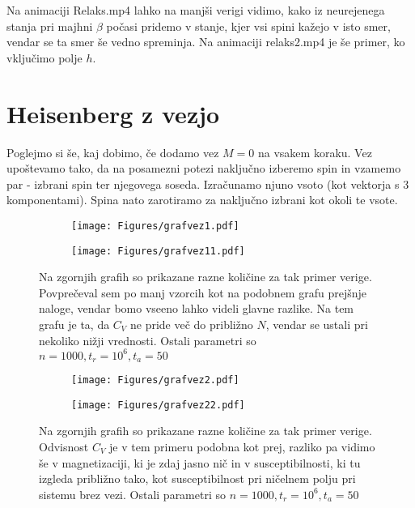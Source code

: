 \documentclass{article}
\begin{document}
Na animaciji Relaks.mp4 lahko na manjši verigi vidimo, kako iz neurejenega stanja pri majhni $\beta$ počasi pridemo v stanje, kjer vsi spini kažejo v isto smer, vendar se ta smer še vedno spreminja. Na animaciji relaks2.mp4 je še primer, ko vključimo polje $h$.

\section*{Heisenberg z vezjo}
Poglejmo si še, kaj dobimo, če dodamo vez $M=0$ na vsakem koraku. Vez upoštevamo tako, da na posamezni potezi naključno izberemo  spin in vzamemo par - izbrani spin ter njegovega soseda. Izračunamo njuno vsoto (kot vektorja s 3 komponentami). Spina nato zarotiramo za naključno izbrani kot okoli te vsote.

\begin{figure}[H]
\centering
\begin{subfigure}{.49\textwidth}
\texttt{[image: Figures/grafvez1.pdf]}
\end{subfigure}
\begin{subfigure}{.49\textwidth}
\texttt{[image: Figures/grafvez11.pdf]}
\end{subfigure}
\caption*{Na zgornjih grafih so prikazane razne količine za tak primer verige. Povprečeval sem po manj vzorcih kot na podobnem grafu prejšnje naloge, vendar bomo vseeno lahko videli glavne razlike. Na tem grafu je ta, da $C_V$ ne pride več do približno $N$, vendar se ustali pri nekoliko nižji vrednosti.  Ostali parametri so $n=1000, t_r=10^6, t_a=50$}
\end{figure}

\begin{figure}[H]
\centering
\begin{subfigure}{.49\textwidth}
\texttt{[image: Figures/grafvez2.pdf]}
\end{subfigure}
\begin{subfigure}{.49\textwidth}
\texttt{[image: Figures/grafvez22.pdf]}
\end{subfigure}
\caption*{Na zgornjih grafih so prikazane razne količine za tak primer verige. Odvisnost $C_V$ je v tem primeru podobna kot prej, razliko pa vidimo še v magnetizaciji, ki je zdaj jasno nič in v susceptibilnosti, ki tu izgleda približno tako, kot susceptibilnost pri ničelnem polju pri sistemu brez vezi.  Ostali parametri so $n=1000, t_r=10^6, t_a=50$}
\end{figure}
\end{document}
